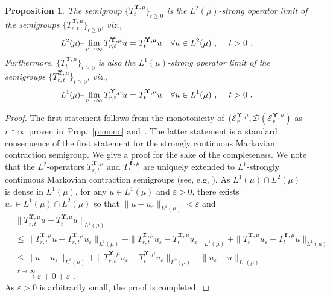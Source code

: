 \documentclass[11pt,letterpaper]{amsart}
\newcommand{\dom}[1]{\mathcal D(#1)}
\newcommand{\diff}{\mathop{}\!\mathrm{d}}
\newcommand{\paren}[1]{\left(#1\right)}							%
\newcommand{\seq}[1]{\paren{#1}}								%
\newcommand{\comma}{\,\,\mathrm{,}\;\,}
\newcommand{\fstop}{\,\,\mathrm{.}}
\newcommand{\QP}{{\mu}}
\newcommand{\e}{\varepsilon}
\newcommand{\dUpsilon}{{\mathbf \Upsilon}}
\newcommand{\U}{\dUpsilon}
\newcommand{\E}{\mathcal E}
\renewcommand{\1}{\mathbf 1}
\numberwithin{equation}{section}
\theoremstyle{plain}
\newtheorem{prop}[thm]{Proposition}%
\theoremstyle{definition}
\theoremstyle{remark}
\begin{document}
\begin{prop}\label{prop: MGS}
The semigroup $\{T^{\U, \QP}_{t}\}_{t \ge 0}$ is the $L^2(\QP)$-strong operator limit of the semigroups $\{T^{\U, \QP}_{r, t}\}_{t \ge 0}$, viz., 
$$\text{{\small $L^2(\mu)$--}}\lim_{r \to \infty} T^{\U, \QP}_{r, t} u= T^{\U, \QP}_t u  \quad \forall u \in  L^2(\QP)\comma \quad t>0 \fstop$$
Furthermore, $\{T^{\U, \QP}_{t}\}_{t \ge 0}$ is also the $L^1(\QP)$-strong operator limit of the semigroups $\{T^{\U, \QP}_{r, t}\}_{t \ge 0}$, viz., 
$$\text{{\small $L^1(\mu)$--}}\lim_{r \to \infty} T^{\U, \QP}_{r, t} u= T^{\U, \QP}_t u  \quad \forall u \in  L^1(\QP)\comma \quad t>0 \fstop$$
\end{prop}
\begin{proof}
The first statement follows from the monotonicity of~$(\E^{\U, \QP}_r, \dom{\E^{\U, \QP}_r}$ as $r\uparrow\infty$ proven in~Prop.~\ref{p:mono}
and~\cite[S.14, p.373]{ReeSim80}. The latter statement is a standard consequence of the first statement for the strongly continuous Markovian contraction semigroup. We give a proof for the sake of the completeness. We note that the $L^2$-operators $T^{\U, \QP}_{r, t}$ and $T^{\U, \QP}_{t}$ are uniquely extended to $L^1$-strongly continuous Markovian contraction semigroups (see, e.g, \cite[(1.5.2) in \S 1.5]{FukOshTak11}). As $L^1(\QP) \cap L^2(\QP)$ is dense in $L^1(\QP)$, for any $u \in L^1(\QP)$ and $\e>0$, there exists $u_\e \in L^1(\QP) \cap L^2(\QP)$ so that $\|u-u_\e\|_{L^1(\QP)}<\e$ and   
\begin{align*}
&\|T^{\U, \QP}_{r, t} u - T^{\U, \QP}_{t}u\|_{L^1(\QP)} 
\\
&\le \|T^{\U, \QP}_{r, t} u - T^{\U, \QP}_{r, t}u_\e\|_{L^1(\QP)} +\|T^{\U, \QP}_{r, t} u_\e - T^{\U, \QP}_{t}u_\e\|_{L^1(\QP)} +\|T^{\U, \QP}_{t} u_\e - T^{\U, \QP}_{t}u\|_{L^1(\QP)} 
\\
&\le \|u - u_\e\|_{L^1(\QP)} +\|T^{\U, \QP}_{r, t} u_\e - T^{\U, \QP}_{t}u_\e\|_{L^2(\QP)} +\| u_\e - u\|_{L^1(\QP)} 
\\
&\xrightarrow{r\to\infty} \e + 0 +\e \fstop
\end{align*}
As $\e>0$ is arbitrarily small, the proof is completed. 
\end{proof}
\end{document}
